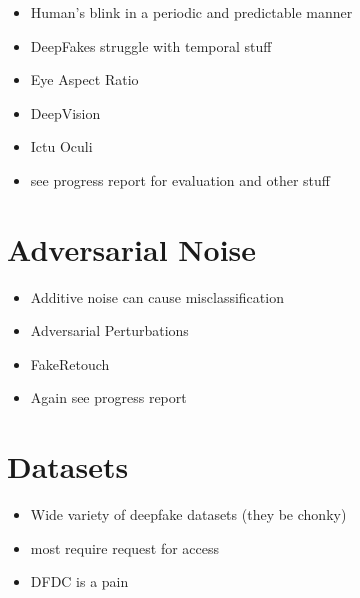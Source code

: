 \begin{itemize}
    \item Human's blink in a periodic and predictable manner
    \item DeepFakes struggle with temporal stuff
    \item Eye Aspect Ratio
    \item DeepVision
    \item Ictu Oculi
    \item see progress report for evaluation and other stuff
\end{itemize}

\section{Adversarial Noise}

\begin{itemize}
    \item Additive noise can cause misclassification
    \item Adversarial Perturbations
    \item FakeRetouch
    \item Again see progress report
\end{itemize}

\section{Datasets}

\begin{itemize}
    \item Wide variety of deepfake datasets (they be chonky)
    \item most require request for access
    \item DFDC is a pain
\end{itemize}